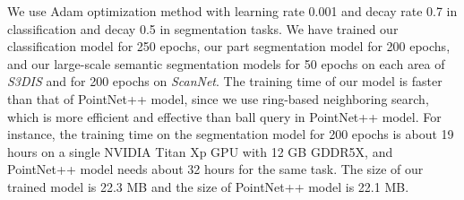 \documentclass[10pt,twocolumn,letterpaper]{article}
\begin{document}
We use Adam optimization method with learning rate 0.001 and decay rate 0.7 in classification and decay 0.5 in segmentation tasks. We have trained our classification model for 250 epochs, our part segmentation model for 200 epochs, and our large-scale semantic segmentation models for 50 epochs on each area of \emph{S3DIS} and for 200 epochs on \emph{ScanNet}. The training time of our model is faster than that of PointNet++ model, since we use ring-based neighboring search, which is more efficient and effective than ball query in PointNet++ model. For instance, the training time on the segmentation model for 200 epochs is about 19 hours on a single NVIDIA Titan Xp GPU with 12 GB GDDR5X, and PointNet++ model needs about 32 hours for the same task. The size of our trained model is 22.3 MB and the size of PointNet++ model is 22.1 MB.
\begin{table*}[t]
\centering
\small \caption
{Network configurations.}\vspace{-2mm}
 \begin{tablenotes}

\end{tablenotes}
\end{table*}
\end{document}
